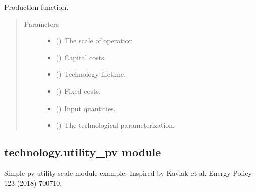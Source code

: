 \documentclass[letterpaper,10pt,english]{sphinxmanual}
\begin{document}
\begin{fulllineitems}
\label{\detokenize{doc-src/technology:technology.simple_electrolysis.production}}
Production function.
\begin{quote}\begin{description}
\item[{Parameters}] \leavevmode\begin{itemize}
\item {} 
 () \textendash{} The scale of operation.

\item {} 
 () \textendash{} Capital costs.

\item {} 
 () \textendash{} Technology lifetime.

\item {} 
 () \textendash{} Fixed costs.

\item {} 
 () \textendash{} Input quantities.

\item {} 
 () \textendash{} The technological parameterization.

\end{itemize}

\end{description}\end{quote}

\end{fulllineitems}



\subsection{technology.utility\_pv module}
\label{\detokenize{doc-src/technology:module-technology.utility_pv}}\label{\detokenize{doc-src/technology:technology-utility-pv-module}}
Simple pv utility-scale module example.  Inspired by Kavlak et al. Energy Policy 123 (2018) 700\textendash{}710.
\end{document}
